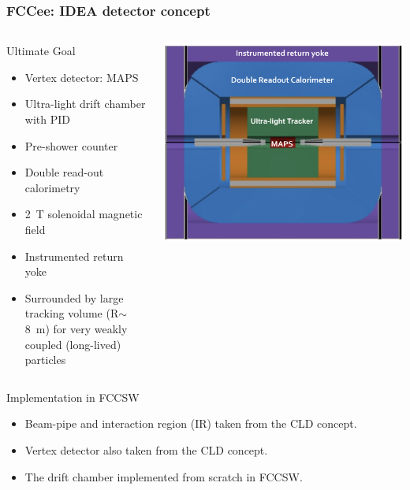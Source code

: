 \documentclass[hyperref={colorlinks=true,pdfpagelabels=false,linkcolor=black}, xcolor=dvipsnames,10pt]{beamer}
\begin{document}
\begin{frame}
	\frametitle{FCCee: IDEA detector concept}
	
	\begin{columns}
	
	\begin{block}{Ultimate Goal}
	\begin{itemize}
	\item Vertex detector: MAPS
	\item Ultra-light drift chamber with PID
	\item Pre-shower counter
	\item Double read-out calorimetry
	\item 2~T solenoidal magnetic field
	\item Instrumented return yoke
	\item Surrounded by large tracking volume (R$\sim$8~m) for very weakly coupled (long-lived) particles
	\end{itemize}
	\end{block}
	\centering
	\includegraphics[width=\textwidth]{../figures/FCCeeIDEAConcept.png}
	\end{columns}

	\begin{block}{Implementation in FCCSW}
	\begin{itemize}
	\item Beam-pipe and interaction region (IR) taken from the CLD concept.
	\item Vertex detector also taken from the CLD concept.
	\item The drift chamber implemented from scratch in FCCSW.
	\end{itemize}
	\end{block}
\end{frame}
\end{document}
